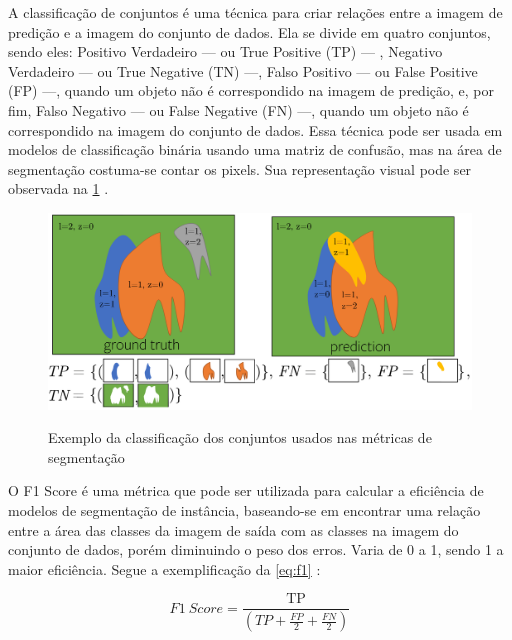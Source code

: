 A classificação de conjuntos é uma técnica para criar relações entre a imagem de predição e a imagem do conjunto de dados. Ela se divide em quatro conjuntos, sendo eles: Positivo Verdadeiro — ou True Positive (TP) —
, Negativo Verdadeiro — ou True Negative (TN) —, Falso Positivo — ou False Positive (FP) —, quando um objeto não é correspondido na imagem de predição, e, por fim, Falso Negativo — ou False Negative (FN) —, quando um objeto não é correspondido na imagem do conjunto de dados. Essa técnica pode ser usada em modelos de classificação binária usando uma matriz de confusão, mas na área de segmentação costuma-se contar os pixels. Sua representação visual pode ser observada na \cref{fig:conjuntos} \space\cite{kirillov2019panoptic, Wang2020}.
\begin{figure}[ht]
    \caption{Exemplo da classificação dos conjuntos usados nas métricas de segmentação}
    \centering %
    \includegraphics[width=15cm]{figures/pan_metric.png} %
    \label{fig:conjuntos}
\end{figure}



O F1 Score é uma métrica que pode ser utilizada para calcular a eficiência de modelos de segmentação de instância, baseando-se em encontrar uma relação entre a área das classes da imagem de saída com as classes na imagem do conjunto de dados, porém diminuindo o peso dos erros. Varia de 0 a 1, sendo 1 a maior eficiência. Segue a exemplificação da \cref{eq:f1} \space\cite{Chicco2020}:

\begin{equation}
    \label{eq:f1}
    F1\ Score = \frac{\text{TP}}{(TP + \frac{FP}{2} + \frac{FN}{2})}
\end{equation}

